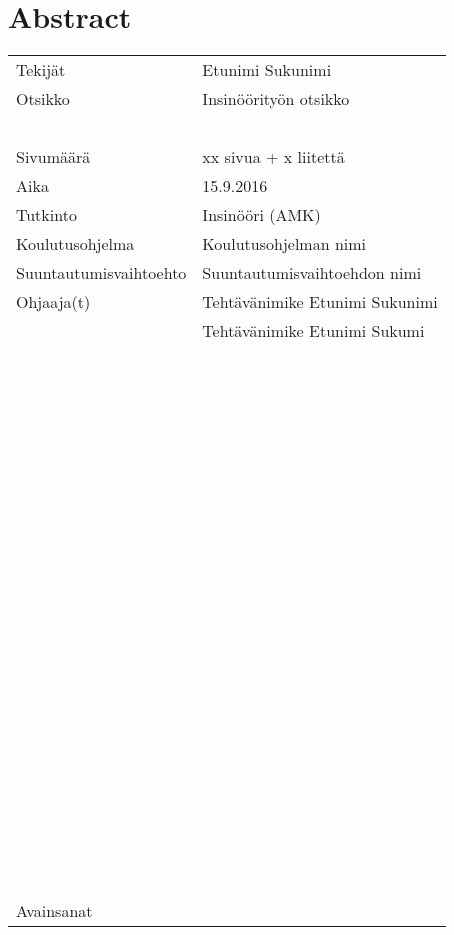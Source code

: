 
\chapter*{Abstract}
\thispagestyle{abstract}
\begin{table}[h]
  \begin{tabularx}{\textwidth}{ |l|X| }
	  \hline
	  Tekijät & Etunimi Sukunimi \\
	  Otsikko & Insinöörityön otsikko \\
	  ~ & ~ \\
	  Sivumäärä & xx sivua + x liitettä \\
	  Aika & 15.9.2016 \\
	  \hline
	  Tutkinto & Insinööri (AMK) \\
	  \hline
	  Koulutusohjelma & Koulutusohjelman nimi \\
	  \hline
	  Suuntautumisvaihtoehto & Suuntautumisvaihtoehdon nimi \\
	  \hline
	  Ohjaaja(t) & Tehtävänimike Etunimi Sukunimi \\
	  ~ & Tehtävänimike Etunimi Sukumi \\
	  \hline
	  ~ & ~ \\
	  ~ & ~ \\
	  ~ & ~ \\
	  ~ & ~ \\
	  ~ & ~ \\
	  ~ & ~ \\
	  ~ & ~ \\
	  ~ & ~ \\
	  ~ & ~ \\
	  ~ & ~ \\
	  ~ & ~ \\
	  ~ & ~ \\
	  ~ & ~ \\
	  ~ & ~ \\
	  ~ & ~ \\
	  ~ & ~ \\
	  ~ & ~ \\
	  ~ & ~ \\
	  ~ & ~ \\
	  \hline
	  Avainsanat & ~ \\
	  \hline
  \end{tabularx}
\end{table}